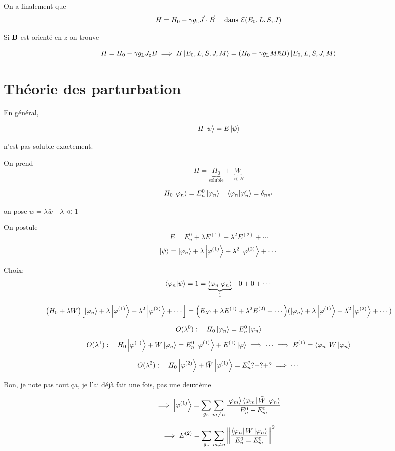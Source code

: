 On a finalement que $$H = H_0 - \gamma g_{\rm L}\vec J \cdot \vec B \quad \text{ dans }\mathcal{E} (E_0, L, S,J)$$  

Si $\vb B$ est orienté en $z$ on trouve

$$H = H_0 -\gamma g_{\rm L}J_{\rm z}B \implies H\ket{E_0, L, S, J, M} = \qty(H_0 - \gamma g_{\rm L}M\hbar B)\ket{E_0, L, S, J, M}$$  


\section*{Théorie des parturbation}

En général,

$$H \ket{\psi}= E\ket{\psi}$$ 

n'est pas soluble exactement.

On prend $$H = \underbrace{H_{0}}_{\text{soluble}}+\underbrace{W}_{\ll H}$$ 

$$H_{0} \ket{\varphi_n} = E_n^0\ket{\varphi_n} \quad \bra{\varphi_n}\ket{\varphi_n'} = \delta_{nn'}$$ 

on pose $w = \lambda \bar w\quad \lambda \ll 1$

On postule $$E = E_{n}^0 +\lambda E^{(1)} + \lambda^2 E^{(2)} + \dotsb$$ 
$$\ket{\psi} = \ket{\varphi_n} + \lambda \ket{\varphi^{(1)}} +\lambda^2 \ket{\varphi^{(2)}}+ \dotsb$$ 

Choix: $$\bra{\varphi_n}\ket{\psi} =1 = \underbrace{\bra{\varphi_n}\ket{\varphi_n}}_1 + 0 +0 + \dotsb$$ 


$$\qty(H_{0}+ \lambda\bar W) \qty[\ket{\varphi_n} + \lambda \ket{\varphi^{(1)}} +\lambda^2 \ket{\varphi^{(2)}}+ \dotsb] = \qty(E_{\lambda^0}+ \lambda E ^{(1)} + \lambda^2 E^{(2)} + \dotsb)(\ket{\varphi_n} + \lambda \ket{\varphi^{(1)}} +\lambda^2 \ket{\varphi^{(2)}}+ \dotsb)$$ 


$$O(\lambda^0): \quad H_{0}\ket{\varphi_n} = E_{n}^0\ket{\varphi_n}$$ 
$$O(\lambda^1): \quad H_{0}\ket{\varphi^{(1)}} + \bar W \ket{\varphi_n} = E^0_n \ket{\varphi^{(1)}} + E^{(1)}\ket{\varphi} \implies \dotsb \implies E^{(1)} = \bra{\varphi_n}\bar W \ket{\varphi_n}$$ 


$$O(\lambda^2): \quad H_0\ket{\varphi^{(2)}} + \bar W \ket{\varphi^{(1)}} = E_n^{?}? + ? + ? \implies \dotsb$$ 


Bon, je note pas tout ça, je l'ai déjà fait une fois, pas une deuxième

$$\implies \ket{\varphi^{(1)}} = \sum_{g_n}\sum_{m\neq n} \frac{\ket{\varphi_m}\bra{\varphi_m}\bar W \ket{\varphi_n}}{E^0_n-E^0_m}$$ 



$$\implies E^{(2)} = \sum_{g_n} \sum_{m\neq n} \norm{\frac{\bra{\varphi_n}\bar W \ket{\varphi_n}}{E^0_n =E^0_m}}^2$$ 





